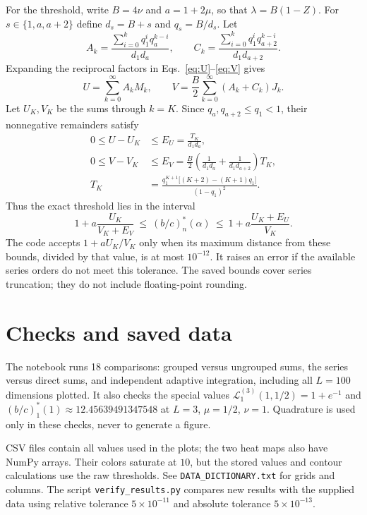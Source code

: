 \documentclass[10pt,a4paper]{article}
\newcommand{\crit}{\left(b/c\right)^{*}_{n}(\alpha)}
\begin{document}
For the threshold, write $B=4\nu$ and $a=1+2\mu$, so that
$\lambda=B(1-Z)$. For $s\in\{1,a,a+2\}$ define
$d_s=B+s$ and $q_s=B/d_s$. Let
\begin{equation*}
 A_k=\frac{\sum_{i=0}^{k}q_1^i q_a^{k-i}}{d_1d_a},\qquad
 C_k=\frac{\sum_{i=0}^{k}q_1^i q_{a+2}^{k-i}}{d_1d_{a+2}}.
\end{equation*}
Expanding the reciprocal factors in Eqs.~\eqref{eq:U}--\eqref{eq:V} gives
\begin{equation*}
 U=\sum_{k=0}^{\infty} A_k M_k,\qquad
 V=\frac{B}{2}\sum_{k=0}^{\infty}(A_k+C_k)J_k.
\end{equation*}
Let $U_K,V_K$ be the sums through $k=K$. Since $q_a,q_{a+2}\leq q_1<1$,
their nonnegative remainders satisfy
\begin{align*}
 0\leq U-U_K&\leq E_U=\frac{T_K}{d_1d_a},\\
 0\leq V-V_K&\leq E_V=\frac{B}{2}\left(\frac{1}{d_1d_a}
                          +\frac{1}{d_1d_{a+2}}\right)T_K,\\
 T_K&=\frac{q_1^{K+1}\bigl[(K+2)-(K+1)q_1\bigr]}{(1-q_1)^2}.
\end{align*}
Thus the exact threshold lies in the interval
\begin{equation*}
 1+a\frac{U_K}{V_K+E_V}\ \leq\ \crit\ \leq\
 1+a\frac{U_K+E_U}{V_K}.
\end{equation*}
The code accepts $1+aU_K/V_K$ only when its maximum distance from these
bounds, divided by that value, is at most $10^{-12}$. It raises an error
if the available series orders do not meet this tolerance. The saved bounds
cover series truncation; they do not include floating-point rounding.

\section*{Checks and saved data}
The notebook runs 18 comparisons: grouped versus ungrouped sums, the series
versus direct sums, and independent adaptive integration, including all
$L=100$ dimensions plotted. It also checks the special values
$\mathcal L_1^{(3)}(1,1/2)=1+e^{-1}$ and
$(b/c)^{*}_{1}(1)\approx12.45639491347548$ at $L=3$, $\mu=1/2$, $\nu=1$.
Quadrature is used only in these checks, never to generate a figure.

CSV files contain all values used in the plots; the two heat maps also have
NumPy arrays. Their colors saturate at $10$, but the stored values and
contour calculations use the raw thresholds. See \texttt{DATA\_DICTIONARY.txt}
for grids and columns. The script \texttt{verify\_results.py} compares new
results with the supplied data using relative tolerance $5\times10^{-11}$
and absolute tolerance $5\times10^{-13}$.
\end{document}
